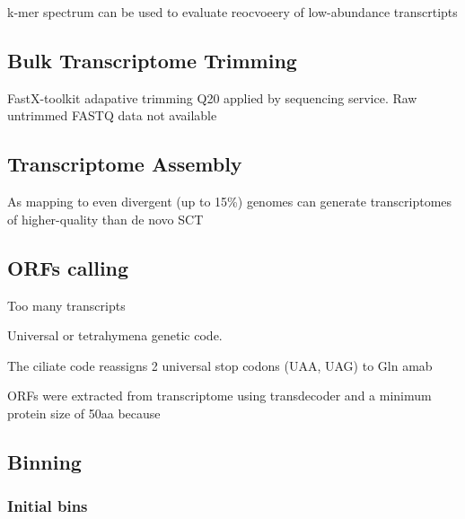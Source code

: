 k-mer spectrum can be used to evaluate reocvoeery of low-abundance transcrtipts \citep{Pop2009}






\subsection{Bulk Transcriptome Trimming}

FastX-toolkit adapative trimming Q20 applied by sequencing service.
Raw untrimmed FASTQ data not available


\subsection{Transcriptome Assembly}

As mapping to even divergent (up to 15\%) genomes can generate transcriptomes of higher-quality
than de novo \citep{Vijay2013}
SCT



\subsection{ORFs calling}

Too many transcripts 

Universal or tetrahymena genetic code.

The ciliate code reassigns 2 universal stop codons (UAA, UAG) to Gln amab



ORFs were extracted from transcriptome using transdecoder and a minimum protein size of 50aa
because


\subsection{Binning}


\subsubsection{Initial bins}

